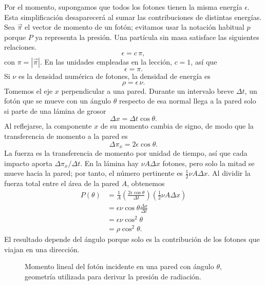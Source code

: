 Por el momento, supongamos que todos los fotones tienen la misma energía \(\epsilon\). Esta simplificación desaparecerá al sumar las contribuciones de distintas energías. Sea \(\vec{\pi}\) el vector de momento de un fotón; evitamos usar la notación habitual \(p\) porque \(P\) ya representa la presión. Una partícula sin masa satisface las siguientes relaciones.
\begin{equation}
\epsilon=c\,\pi,
\end{equation}
con \(\pi=|\vec{\pi}|\). En las unidades empleadas en la lección, \(c=1\), así que
\begin{equation}
\epsilon=\pi.
\end{equation}
Si \(\nu\) es la densidad numérica de fotones, la densidad de energía es
\begin{equation}
\rho=\epsilon\,\nu.
\end{equation}
Tomemos el eje \(x\) perpendicular a una pared. Durante un intervalo breve \(\Delta t\), un fotón que se mueve con un ángulo \(\theta\) respecto de esa normal llega a la pared solo si parte de una lámina de grosor
\begin{equation}
\Delta x=\Delta t\cos\theta.
\end{equation}
Al reflejarse, la componente \(x\) de su momento cambia de signo, de modo que la transferencia de momento a la pared es
\begin{equation}
\Delta \pi_x=2\epsilon\cos\theta.
\end{equation}
La fuerza es la transferencia de momento por unidad de tiempo, así que cada impacto aporta \(\Delta \pi_x/\Delta t\). En la lámina hay \(\nu A\Delta x\) fotones, pero solo la mitad se mueve hacia la pared; por tanto, el número pertinente es \(\tfrac12 \nu A\Delta x\). Al dividir la fuerza total entre el área de la pared \(A\), obtenemos
\begin{align}
P(\theta)
&=
\frac{1}{A}
\left(\frac{2\epsilon\cos\theta}{\Delta t}\right)
\left(\frac12 \nu A\Delta x\right) \\
&=
\epsilon\nu\cos\theta\frac{\Delta x}{\Delta t} \\
&=
\epsilon\nu\cos^2\theta \\
&=
\rho\cos^2\theta.
\end{align}
El resultado depende del ángulo porque solo es la contribución de los fotones que viajan en una dirección.

\begin{figure}[htbp]
\centering
{}
\caption{Momento lineal del fotón incidente en una pared con ángulo \(\theta\), geometría utilizada para derivar la presión de radiación.}
\label{fig:c05-photon-pressure}
\end{figure}

